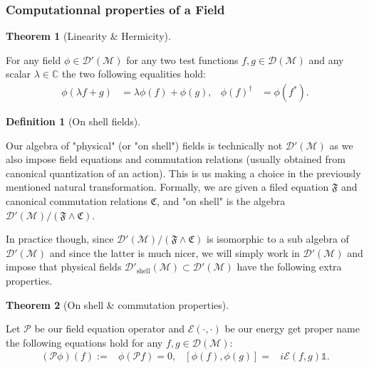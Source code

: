 \documentclass[a4paper,11pt]{article}
\numberwithin{equation}{section}
\theoremstyle{definition}
\newtheorem{definition}{Definition}
\newtheorem{theorem}{Theorem}
\begin{document}
\subsubsection{Computationnal properties of a Field}
        \begin{theorem}[Linearity \& Hermicity]$\quad$
        
         For any field $\phi\in\mathcal{D}'(\mathcal{M})$ for any two test functions $f,g\in\mathcal{D}(\mathcal{M})$ and any scalar $\lambda\in\mathbb{C}$  the two following equalities hold:
         \begin{align*}
             \phi(\lambda f+ g) &= \lambda\phi(f)+ \phi(g),&
             \phi(f)^\dag &= \phi(f^*).
         \end{align*}
        \end{theorem}
        \begin{definition}[On shell fields]$\quad$

        Our algebra of "physical" (or "on shell") fields is technically not $\mathcal{D}'(\mathcal{M})$ as we also impose field equations and commutation relations (usually obtained from canonical quantization of an action). This is us making a choice in the previously mentioned natural transformation. Formally, we are given a filed equation $\mathfrak{F}$ and canonical commutation relations $\mathfrak{C}$, and "on shell" is the algebra $\mathcal{D}'(\mathcal{M})/(\mathfrak{F}\wedge\mathfrak{C})$.

        In practice though, since $\mathcal{D}'(\mathcal{M})/(\mathfrak{F}\wedge\mathfrak{C})$ is isomorphic to a sub algebra of $\mathcal{D}'(\mathcal{M})$ and since the latter is much nicer, we will simply work in $\mathcal{D}'(\mathcal{M})$ and impose that physical fields $\mathcal{D}'_\mathrm{shell}(\mathcal{M})\subset\mathcal{D}'(\mathcal{M})$ have the following extra properties.
        \end{definition}
        
        \begin{theorem}[On shell \& commutation properties]$\quad$
        
        Let $\mathcal{P}$ be our field equation operator and $\mathcal{E}(\cdot,\cdot)$ be our energy \color{red} get proper name\color{black} the following equations hold for any $f,g\in\mathcal{D}(\mathcal{M})$:
        \begin{align*}
            (\mathcal{P}\phi)(f):=&\phi(\mathcal{P}f)=0, &
            [\phi(f),\phi(g)]=&i\mathcal{E}(f,g)\mathds{1}.
        \end{align*}            
        \end{theorem}
\end{document}
